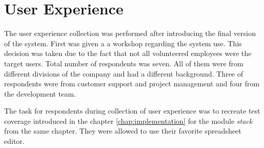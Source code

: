 \chapter{User Experience}
\label{chap:UX}
The user experience collection was performed after introducing the final version of the system. First was given a a workshop regarding the system use. This decision was taken due to the fact that not all volunteered employees were the target users. Total number of respondents was seven. All of them were from different divisions of the company and had a different background. Three of respondents were from customer support and project management and four from the development team. 

The task for respondents during collection of user experience was to recreate test coverage introduced in the chapter \ref{chap:implementation} for the module \textit{stack} from the same chapter. They were allowed to use their favorite spreadsheet editor.

